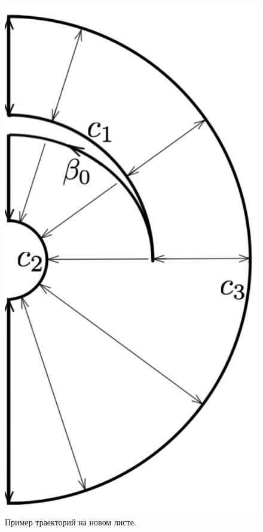\begin{figure}[!htb]
\centering
\includegraphics[scale=0.11]{images/ch4/section3_circular/atoms/II/bifurcation/trajectories_2.pdf}
    \caption{Пример траекторий на новом листе.}
        \label{fig:pt10:_II_trajectories_2}

\end{figure}
